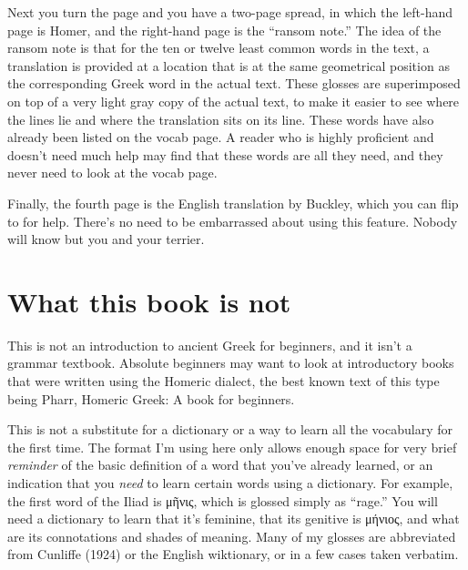 {Next you turn the page and you have a two-page spread, in which the
left-hand page is Homer, and the right-hand page is the ``ransom note.''
The idea of the ransom note is that for the ten or twelve least common
words in the text, a translation is provided at a location that is at
the same geometrical position as the corresponding Greek word in the
actual text. These glosses are superimposed on top of a very light
gray copy of the actual text, to make it easier to see where the lines
lie and where the translation sits on its line. These words have also
already been listed on the vocab page. A reader who is highly
proficient and doesn't need much help may find that these words are
all they need, and they never need to look at the vocab page.

Finally, the fourth page is the English translation by Buckley, which you can flip to for help.
There's no need to be embarrassed about using this feature. Nobody will know but you and
your terrier.

\section*{What this book is not}

This is not an introduction to ancient Greek for beginners, and it isn't a grammar textbook.
Absolute beginners may want to look at introductory books that were written using the Homeric
dialect, the best known text of this type being Pharr, Homeric Greek: A book for beginners.

This is not a substitute for a dictionary or a way to learn all the vocabulary for the first
time. The format I'm using here only allows enough space
for very brief \emph{reminder} of the basic definition of a word that you've already learned,
or an indication that you \emph{need} to learn certain words using a dictionary. For example,
the first word of the Iliad is μῆνις, which is glossed simply as ``rage.'' You will need a
dictionary to learn that it's feminine, that its genitive is μήνιος, and what are its connotations
and shades of meaning. Many of my glosses are abbreviated from Cunliffe (1924) or the English wiktionary, or in a few cases taken verbatim.

}
